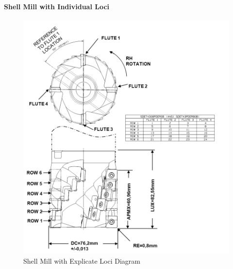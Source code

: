\pagebreak

\paragraph{Shell Mill with Individual Loci}\mbox{}
\label{sec:Shell Mill with Individual Loci}

\begin{figure}[ht]
  \centering
    \includegraphics[width=1.0\textwidth]{figures/Shell Mill with Explicate Loci.png}
  \caption{Shell Mill with Explicate Loci Diagram}
  \label{fig:Shell Mill with Explicate Loci Diagram}
\end{figure}

\FloatBarrier



